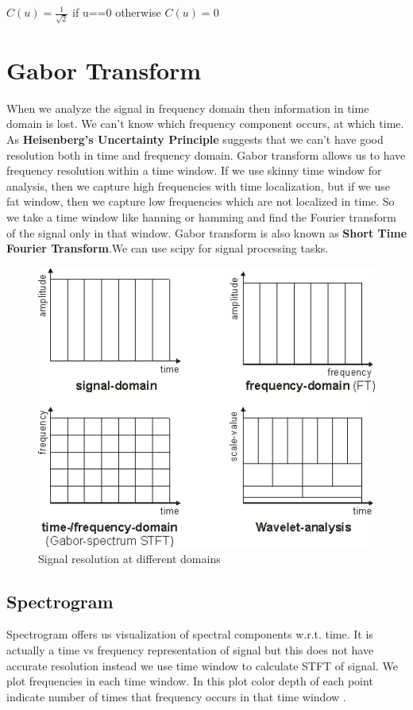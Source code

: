 \documentclass[11pt]{report}
\begin{document}
$C(u) = \frac{1}{ \sqrt2 } $ if u==0 otherwise
$C(u) =0 $  







\newpage
\section{Gabor Transform}
When we analyze the signal in frequency domain then information in time domain is lost. We can't know which frequency component occurs, at which time. As \textbf{Heisenberg's Uncertainty Principle} suggests that we can't have good resolution both in time and frequency domain. Gabor transform allows us to have frequency resolution within a time window. If we use skinny time window for analysis, then we capture high frequencies with time localization, but if we use fat window, then we capture low frequencies which are not localized in time.
So we take a time window like hanning or hamming and find the Fourier transform of the signal only in that window. Gabor transform is also known as \textbf{Short Time Fourier Transform}.We can use scipy \cite{scipy} for signal processing tasks.

 

\begin{figure}[h]
\centering
\includegraphics[scale=.6]{./images/domain.png}
\caption{Signal resolution at different domains}
\end{figure}

\subsection{Spectrogram}
Spectrogram offers us visualization of spectral components w.r.t. time. It is actually a time vs frequency representation of signal but this does not have accurate resolution instead we use time window to calculate STFT of signal. We plot frequencies in each time window. In this plot color depth of each point indicate number of times that frequency occurs in that time window \cite{acoustic}. 
\end{document}
